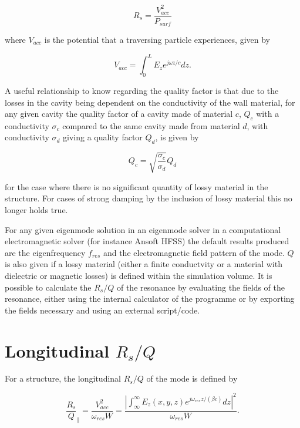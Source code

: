 \begin{equation}
R_{s} = \frac{V_{acc}^{2}}{P_{surf}}
\end{equation}

where $V_{acc}$ is the potential that a traversing particle experiences, given by

\begin{equation}
V_{acc} = \int^{L}_{0} E_{z} e^{j\omega z/c} dz.
\end{equation}

A useful relationship to know regarding the quality factor is that due to the losses in the cavity being dependent on the conductivity of the wall material, for any given cavity the quality factor of a cavity made of material $c$, $Q_{c}$ with a conductivity $\sigma_{c}$ compared to the same cavity made from material $d$, with conductivity $\sigma_{d}$ giving a quality factor $Q_{d}$, is given by

\begin{equation}
Q_{c} = \sqrt{\frac{\sigma_{c}}{\sigma_{d}}}Q_{d}
\end{equation}

for the case where there is no significant quantity of lossy material in the structure. For cases of strong damping by the inclusion of lossy material this no longer holds true.

For any given eigenmode solution in an eigenmode solver in a computational electromagnetic solver (for instance Ansoft HFSS) the default results produced are the eigenfrequency $f_{res}$ and the electromagnetic field pattern of the mode. $Q$ is also given if a lossy material (either a finite conductvity or a material with dielectric or magnetic losses)  is defined within the simulation volume. It is possible to calculate the $R_{s}/Q$ of the resonance by evaluating the fields of the resonance, either using the internal calculator of the programme or by exporting the fields necessary and using an external script/code.

\section{Longitudinal $R_{s}/Q$}

For a structure, the longitudinal $R_{s}/Q$ of the mode is defined by

\begin{equation}
\frac{R_{s}}{Q}_{\parallel} = \frac{V_{acc}^{2}}{\omega_{res} W} = \frac{\left| \int^{\infty}_{\infty} E_{z} \left( x,y,z \right) e^{j \omega_{res}z/\left( \beta c \right)} dz \right|^{2}}{\omega_{res} W}. 
\end{equation}

